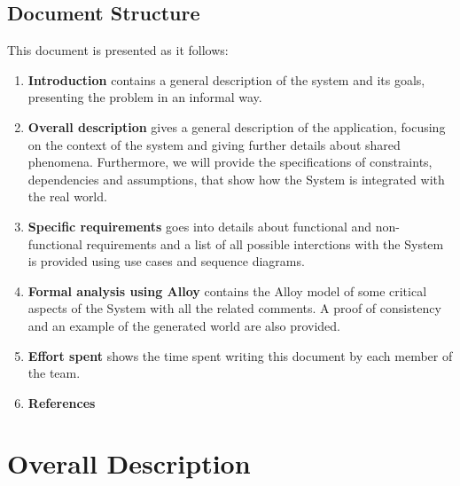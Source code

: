 \documentclass{report}
\begin{document}
\section{Document Structure}
This document is presented as it follows:
\begin{enumerate}
	\item {\textbf{Introduction}} contains a general description of the system and its goals, presenting the problem in an informal way.
	\item{\textbf{Overall description}} gives a general description of the application, focusing on the context of the system and giving further details about shared phenomena. Furthermore, we will provide the specifications of constraints, dependencies and assumptions, that show how the System is integrated with the real world.
	\item{\textbf{Specific requirements}} goes into details about functional and non-functional requirements and a list of all possible interctions with the System is provided using use cases and sequence diagrams.
	\item {\textbf{Formal analysis using Alloy}} contains the Alloy model of some critical aspects of the System with all the related comments. A proof of consistency and an example of the generated world are also provided.
	\item {\textbf{Effort spent}} shows the time spent writing this document by each member of the team.
	\item {\textbf{References}}
\end{enumerate}

\chapter{Overall Description}
\end{document}
